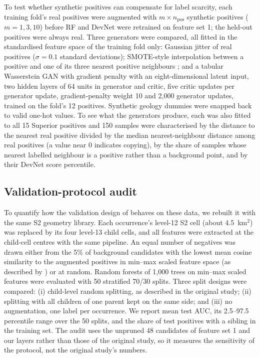 \documentclass[pdflatex,sn-apa]{sn-jnl}
\begin{document}
To test whether synthetic positives can compensate for label scarcity, each training fold's real positives were augmented with $m \times n_{\mathrm{pos}}$ synthetic positives ($m = 1, 3, 10$) before RF and DevNet were retrained on feature set 1; the held-out positives were always real. Three generators were compared, all fitted in the standardised feature space of the training fold only: Gaussian jitter of real positives ($\sigma = 0.1$ standard deviations); SMOTE-style interpolation between a positive and one of its three nearest positive neighbours \citep{Chawla2002}; and a tabular Wasserstein GAN with gradient penalty \citep[WGAN-GP;][]{Goodfellow2014,Arjovsky2017,Gulrajani2017} with an eight-dimensional latent input, two hidden layers of 64 units in generator and critic, five critic updates per generator update, gradient-penalty weight 10 and 2,000 generator updates, trained on the fold's 12 positives. Synthetic geology dummies were snapped back to valid one-hot values. To see what the generators produce, each was also fitted to all 15 Superior positives and 150 samples were characterised by the distance to the nearest real positive divided by the median nearest-neighbour distance among real positives (a value near 0 indicates copying), by the share of samples whose nearest labelled neighbour is a positive rather than a background point, and by their DevNet score percentile.

\subsection{Validation-protocol audit}\label{sec:audit-methods}

To quantify how the validation design of \citet{Parsa2024} behaves on these data, we rebuilt it with the same S2 geometry library. Each occurrence's level-12 S2 cell (about 4.5~km$^2$) was replaced by its four level-13 child cells, and all features were extracted at the child-cell centres with the same pipeline. An equal number of negatives was drawn either from the 5\% of background candidates with the lowest mean cosine similarity to the augmented positives in min--max scaled feature space (as described by \citealp{Parsa2024}) or at random. Random forests of 1,000 trees on min--max scaled features were evaluated with 50 stratified 70/30 splits. Three split designs were compared: (i) child-level random splitting, as described in the original study; (ii) splitting with all children of one parent kept on the same side; and (iii) no augmentation, one label per occurrence. We report mean test AUC, its 2.5--97.5 percentile range over the 50 splits, and the share of test positives with a sibling in the training set. The audit uses the unpruned 48 candidates of feature set 1 and our layers rather than those of the original study, so it measures the sensitivity of the protocol, not the original study's numbers.
\end{document}
